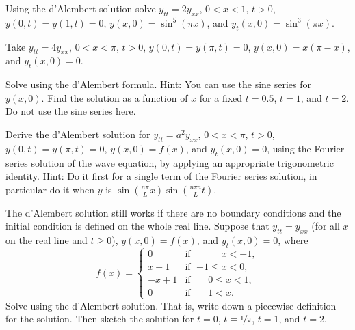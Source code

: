 \begin{exercise}
Using the d'Alembert solution solve $y_{tt} = 2y_{xx}$, $0 < x < 1$, $t > 0$,
$y(0,t) = y(1, t) = 0$, $y(x,0) = \sin^5 (\pi x)$, and
$y_t(x,0) = \sin^3 (\pi x)$.
\end{exercise}

\pagebreak[2]
\begin{exercise}
Take
$y_{tt} = 4y_{xx}$, $0 < x < \pi$, $t > 0$,
$y(0,t) = y(\pi, t) = 0$, $y(x,0) = x(\pi-x)$, and
$y_t(x,0) = 0$.
\begin{tasks}
\task Solve using the d'Alembert formula.  Hint: You can use the sine series
for $y(x,0)$.
\task Find the solution as a function of $x$ for a fixed $t=0.5$, $t=1$, and
$t=2$.  Do not use the sine series here.
\end{tasks}
\end{exercise}

\begin{exercise}
Derive the d'Alembert solution for $y_{tt} = a^2 y_{xx}$, $0 < x < \pi$, $t >
0$,
$y(0,t) = y(\pi, t) = 0$, $y(x,0) = f(x)$, and
$y_t(x,0) = 0$, using the Fourier series solution of the wave equation,
by applying an appropriate trigonometric identity.
Hint: Do it first for a single term of the Fourier series solution,
in particular do it when $y$ is
$\sin\left(\frac{n \pi}{L} x \right)\sin\left(\frac{n \pi a}{L} t \right)$.
\end{exercise}

\begin{exercise}
The d'Alembert solution still works if there are no boundary conditions and
the initial condition is defined on the whole real line.  Suppose that
$y_{tt} = y_{xx}$ (for all $x$ on the real line and $t \geq 0$),
$y(x,0) = f(x)$, and
$y_t(x,0) = 0$, where
\begin{equation*}
f(x) =
\begin{cases}
0 & \text{if } \; \phantom{{-1} \leq {} }x < -1, \\
x+1 & \text{if } \; {-1} \leq x < 0, \\
-x+1 & \text{if } \; \phantom{-}0 \leq x < 1, \\
0 & \text{if } \; \phantom{-}1 < x .
\end{cases}
\end{equation*}
Solve using the d'Alembert solution. That is, write down a piecewise
definition for the solution.  Then sketch the solution for $t=0$,
$t=\nicefrac{1}{2}$, $t=1$, and $t=2$.
\end{exercise}


